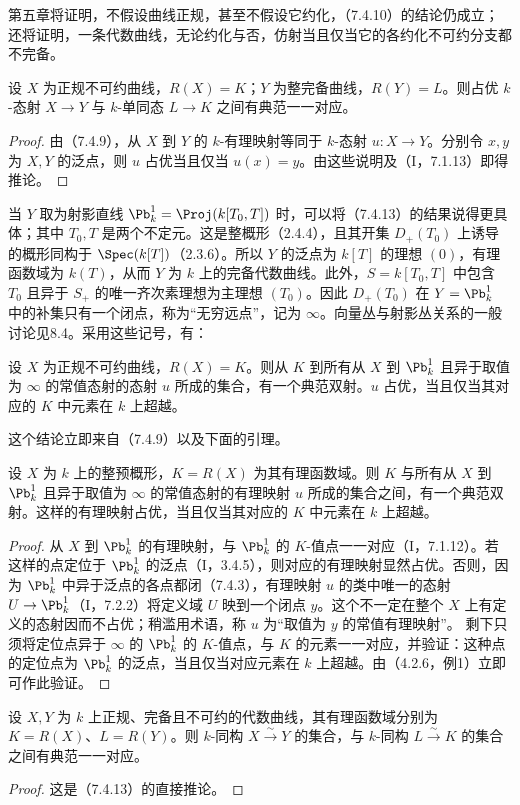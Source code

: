 第五章将证明，不假设曲线正规，甚至不假设它约化，（7.4.10）的结论仍成立；还将证明，一条代数曲线，无论约化与否，仿射当且仅当它的各约化不可约分支都不完备。

设 $X$ 为正规不可约曲线，$R(X)=K$；$Y$ 为整完备曲线，$R(Y)=L$。则占优 $k$-态射 $X\to Y$ 与 $k$-单同态 $L\to K$ 之间有典范一一对应。
\begin{proof}
由（7.4.9），从 $X$ 到 $Y$ 的 $k$-有理映射等同于 $k$-态射 $u:X\to Y$。分别令 $x,y$ 为 $X,Y$ 的泛点，则 $u$ 占优当且仅当 $u(x)=y$。由这些说明及（I，7.1.13）即得推论。
\end{proof}

当 $Y$ 取为射影直线 $\Pb_k^1=\Proj(k[T_0,T])$ 时，可以将（7.4.13）的结果说得更具体；其中 $T_0,T$ 是两个不定元。这是整概形（2.4.4），且其开集 $D_+(T_0)$ 上诱导的概形同构于 $\Spec(k[T])$（2.3.6）。所以 $Y$ 的泛点为 $k[T]$ 的理想 $(0)$，有理函数域为 $k(T)$，从而 $Y$ 为 $k$ 上的完备代数曲线。此外，$S=k[T_0,T]$ 中包含 $T_0$ 且异于 $S_+$ 的唯一齐次素理想为主理想 $(T_0)$。因此 $D_+(T_0)$ 在 $Y=\Pb_k^1$ 中的补集只有一个闭点，称为“无穷远点”，记为 $\infty$。向量丛与射影丛关系的一般讨论见8.4。采用这些记号，有：

设 $X$ 为正规不可约曲线，$R(X)=K$。则从 $K$ 到所有从 $X$ 到 $\Pb_k^1$ 且异于取值为 $\infty$ 的常值态射的态射 $u$ 所成的集合，有一个典范双射。$u$ 占优，当且仅当其对应的 $K$ 中元素在 $k$ 上超越。

这个结论立即来自（7.4.9）以及下面的引理。

设 $X$ 为 $k$ 上的整预概形，$K=R(X)$ 为其有理函数域。则 $K$ 与所有从 $X$ 到 $\Pb_k^1$ 且异于取值为 $\infty$ 的常值态射的有理映射 $u$ 所成的集合之间，有一个典范双射。这样的有理映射占优，当且仅当其对应的 $K$ 中元素在 $k$ 上超越。
\begin{proof}
从 $X$ 到 $\Pb_k^1$ 的有理映射，与 $\Pb_k^1$ 的 $K$-值点一一对应（I，7.1.12）。若这样的点定位于 $\Pb_k^1$ 的泛点（I，3.4.5），则对应的有理映射显然占优。否则，因为 $\Pb_k^1$ 中异于泛点的各点都闭（7.4.3），有理映射 $u$ 的类中唯一的态射 $U\to\Pb_k^1$（I，7.2.2）将定义域 $U$ 映到一个闭点 $y$。这个不一定在整个 $X$ 上有定义的态射因而不占优；稍滥用术语，称 $u$ 为“取值为 $y$ 的常值有理映射”。
剩下只须将定位点异于 $\infty$ 的 $\Pb_k^1$ 的 $K$-值点，与 $K$ 的元素一一对应，并验证：这种点的定位点为 $\Pb_k^1$ 的泛点，当且仅当对应元素在 $k$ 上超越。由（4.2.6，例1）立即可作此验证。
\end{proof}

设 $X,Y$ 为 $k$ 上正规、完备且不可约的代数曲线，其有理函数域分别为 $K=R(X)$、$L=R(Y)$。则 $k$-同构 $X\xrightarrow{\sim}Y$ 的集合，与 $k$-同构 $L\xrightarrow{\sim}K$ 的集合之间有典范一一对应。
\begin{proof}
这是（7.4.13）的直接推论。
\end{proof}

